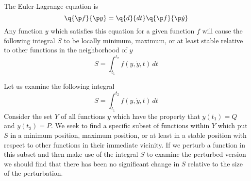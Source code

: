 



\noindent
The Euler-Lagrange equation is
$$
\q{\p f}{\p y} = \q{d }{dt}\q{\p f}{\p \dot y}
$$
Any function $y$ which satisfies this equation for a given function $f$ will
cause the following integral $S$ to be locally minimum, maximum, or at least
stable relative to other functions in the neighborhood of $y$
$$
S = \int_{t_1}^{t_2} f(y, \dot y, t) \, dt
$$


\noindent
Let us examine the following integral
$$
S = \int_{t_1}^{t_2} f(y, \dot y, t) \, dt
$$
Consider the set $Y$ of all functions $y$ which have the property that $y(t_1)
= Q$ and $y(t_2) = P$. We seek to find a specific subset of functions within
$Y$ which put $S$ in a minimum position, maximum position, or at least in a
stable position with respect to other functions in their immediate vicinity.
If we perturb a function in this subset and then make use of the integral $S$
to examine the perturbed version we should find that there has been no
significant change in $S$ relative to the size of the perturbation.

